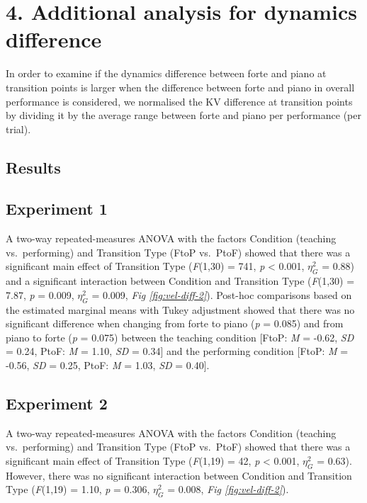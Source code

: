 \documentclass[
  man,floatsintext]{apa6}
\begin{document}
\clearpage

\hypertarget{additional-analysis-for-dynamics-difference}{%
\section{4. Additional analysis for dynamics difference}\label{additional-analysis-for-dynamics-difference}}

In order to examine if the dynamics difference between forte and piano at transition points is larger when the difference between forte and piano in overall performance is considered, we normalised the KV difference at transition points by dividing it by the average range between forte and piano per performance (per trial).

\hypertarget{results-4}{%
\subsection{Results}\label{results-4}}

\hypertarget{experiment-1-4}{%
\subsection{Experiment 1}\label{experiment-1-4}}

A two-way repeated-measures ANOVA with the factors Condition (teaching vs.~performing) and Transition Type (FtoP vs.~PtoF) showed that there was a significant main effect of Transition Type (\emph{F}(1,30) = 741, \emph{p} \textless{} 0.001, \(\eta_G^2\) = 0.88) and a significant interaction between Condition and Transition Type (\emph{F}(1,30) = 7.87, \emph{p} = 0.009, \(\eta_G^2\) = 0.009, \emph{Fig \ref{fig:vel-diff-2}}). Post-hoc comparisons based on the estimated marginal means with Tukey adjustment showed that there was no significant difference when changing from forte to piano (\emph{p} = 0.085) and from piano to forte (\emph{p} = 0.075) between the teaching condition {[}FtoP: \emph{M} = -0.62, \emph{SD} = 0.24, PtoF: \emph{M} = 1.10, \emph{SD} = 0.34{]} and the performing condition {[}FtoP: \emph{M} = -0.56, \emph{SD} = 0.25, PtoF: \emph{M} = 1.03, \emph{SD} = 0.40{]}.

\hypertarget{experiment-2-4}{%
\subsection{Experiment 2}\label{experiment-2-4}}

A two-way repeated-measures ANOVA with the factors Condition (teaching vs.~performing) and Transition Type (FtoP vs.~PtoF) showed that there was a significant main effect of Transition Type (\emph{F}(1,19) = 42, \emph{p} \textless{} 0.001, \(\eta_G^2\) = 0.63). However, there was no significant interaction between Condition and Transition Type (\emph{F}(1,19) = 1.10, \emph{p} = 0.306, \(\eta_G^2\) = 0.008, \emph{Fig \ref{fig:vel-diff-2}}).
\end{document}
